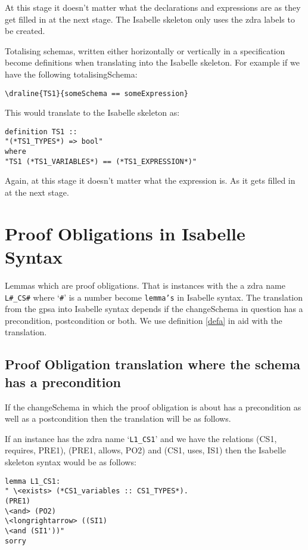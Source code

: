 At this stage it doesn't matter what the declarations and expressions are as they get filled in at the next stage. The Isabelle skeleton only uses the \gls{zdra} labels to be created.

Totalising schemas, written either horizontally or vertically in a specification become definitions when translating into the Isabelle skeleton. For example if we have the following totalisingSchema:

\verb|\draline{TS1}{someSchema == someExpression}|

This would translate to the Isabelle skeleton as:

\begin{verbatim}
definition TS1 ::
"(*TS1_TYPES*) => bool"
where
"TS1 (*TS1_VARIABLES*) == (*TS1_EXPRESSION*)"
\end{verbatim}

Again, at this stage it doesn't matter what the expression is. As it gets filled in at the next stage.

\section{Proof Obligations in Isabelle Syntax}

Lemmas which are proof obligations. That is instances with the a \gls{zdra} name \texttt{L\#\_CS\#} where `\texttt{\#}' is a number become \texttt{lemma's} in Isabelle syntax. The translation from the \gls{gpsa} into Isabelle syntax depends if the changeSchema in question has a precondition, postcondition or both. We use definition \ref{defa} in aid with the translation.

\subsection{Proof Obligation translation where the schema has a precondition}

If the changeSchema in which the proof obligation is about has a precondition as well as a postcondition then the translation will be as follows. 

If an instance has the \gls{zdra} name `\texttt{L1\_CS1}' and we have the relations (CS1, requires, PRE1), (PRE1, allows, PO2) and (CS1, uses, IS1) then the Isabelle skeleton syntax would be as follows:

\begin{verbatim}
lemma L1_CS1:
" \<exists> (*CS1_variables :: CS1_TYPES*).
(PRE1)
\<and> (PO2)
\<longrightarrow> ((SI1)
\<and (SI1'))"
sorry
\end{verbatim}

